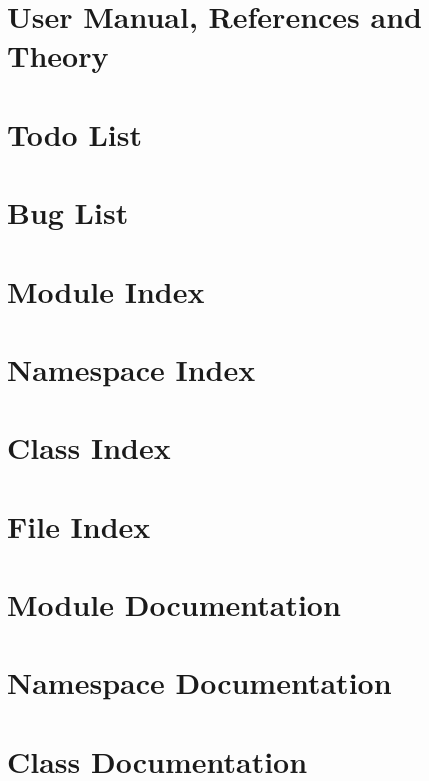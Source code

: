 \documentclass[twoside]{book}
\newcommand{\+}{\discretionary{\mbox{\scriptsize$\hookleftarrow$}}{}{}}
\begin{document}
\chapter{User Manual, References and Theory}
\label{page_ref_the}
\hypertarget{page_ref_the}{}

\chapter{Todo List}
\label{todo}
\hypertarget{todo}{}

\chapter{Bug List}
\label{bug}
\hypertarget{bug}{}

\chapter{Module Index}

\chapter{Namespace Index}

\chapter{Class Index}

\chapter{File Index}

\chapter{Module Documentation}







\chapter{Namespace Documentation}

\chapter{Class Documentation}

























\end{document}

